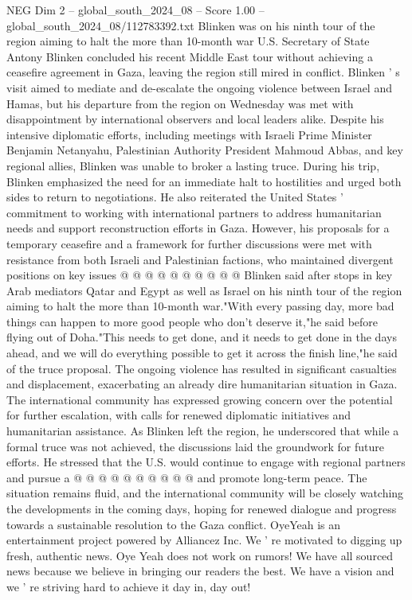 \begin{textsample}{NEG Dim 2 – global\_south\_2024\_08 – Score 1.00 – global\_south\_2024\_08/112783392.txt}  \label{ex:f2_neg_114}
Blinken was on his ninth tour of the region aiming to halt the more than 10-month war U.S.
Secretary of State Antony Blinken concluded his recent Middle East tour without achieving a ceasefire agreement in Gaza, leaving the region still mired in conflict.
Blinken ' s visit aimed to mediate and de-escalate the ongoing violence between Israel and Hamas, but his departure from the region on Wednesday was met with disappointment by international observers and local leaders alike.
Despite his intensive diplomatic efforts, including meetings with Israeli Prime Minister Benjamin Netanyahu, Palestinian Authority President Mahmoud Abbas, and key regional allies, Blinken was unable to broker a lasting truce.
During his trip, Blinken emphasized the need for an immediate halt to hostilities and urged both sides to return to negotiations.
He also reiterated the United States ' commitment to working with international partners to address humanitarian needs and support reconstruction efforts in Gaza.
However, his proposals for a temporary ceasefire and a framework for further discussions were met with resistance from both Israeli and Palestinian factions, who maintained divergent positions on key issues @ @ @ @ @ @ @ @ @ @ Blinken said after stops in key Arab mediators Qatar and Egypt as well as Israel on his ninth tour of the region aiming to halt the more than 10-month war."With every passing day, more bad things can happen to more good people who don't deserve it,"he said before flying out of Doha."This needs to get done, and it needs to get done in the days ahead, and we will do everything possible to get it across the finish line,"he said of the truce proposal.
The ongoing violence has resulted in significant casualties and displacement, exacerbating an already dire humanitarian situation in Gaza.
The international community has expressed growing concern over the potential for further escalation, with calls for renewed diplomatic initiatives and humanitarian assistance.
As Blinken left the region, he underscored that while a formal truce was not achieved, the discussions laid the groundwork for future efforts.
He stressed that the U.S. would continue to engage with regional partners and pursue a @ @ @ @ @ @ @ @ @ @ and promote long-term peace.
The situation remains fluid, and the international community will be closely watching the developments in the coming days, hoping for renewed dialogue and progress towards a sustainable resolution to the Gaza conflict.
OyeYeah is an entertainment project powered by Alliancez Inc.
We ' re motivated to digging up fresh, authentic news.
Oye Yeah does not work on rumors!
We have all sourced news because we believe in bringing our readers the best.
We have a vision and we ' re striving hard to achieve it day in, day out!

\end{textsample}
